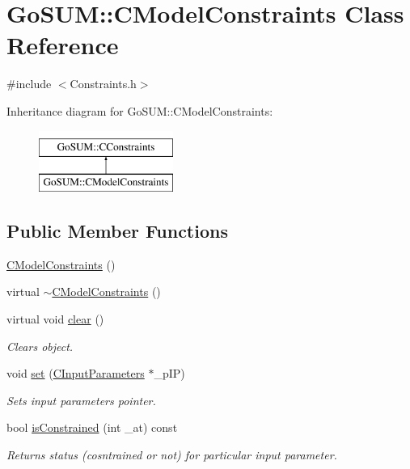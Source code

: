\hypertarget{class_go_s_u_m_1_1_c_model_constraints}{\section{Go\-S\-U\-M\-:\-:C\-Model\-Constraints Class Reference}
\label{class_go_s_u_m_1_1_c_model_constraints}
}


{\ttfamily \#include $<$Constraints.\-h$>$}

Inheritance diagram for Go\-S\-U\-M\-:\-:C\-Model\-Constraints\-:\begin{figure}[H]
\begin{center}
\leavevmode
\includegraphics[height=2.000000cm]{class_go_s_u_m_1_1_c_model_constraints}
\end{center}
\end{figure}
\subsection*{Public Member Functions}
\begin{DoxyCompactItemize}
\item 
\hyperlink{class_go_s_u_m_1_1_c_model_constraints_a1d6d718ab8ceeef75a4e35bbc747ccba}{C\-Model\-Constraints} ()
\item 
virtual \hyperlink{class_go_s_u_m_1_1_c_model_constraints_a903d48132b0bc708f1ae4c72bb1f1223}{$\sim$\-C\-Model\-Constraints} ()
\item 
virtual void \hyperlink{class_go_s_u_m_1_1_c_model_constraints_ab547fb9c0109eb85715d65caf04eed84}{clear} ()
\begin{DoxyCompactList}\small\item\em Clears object. \end{DoxyCompactList}\item 
void \hyperlink{class_go_s_u_m_1_1_c_model_constraints_a0191da2921b3dd708e7aa5466735402b}{set} (\hyperlink{class_go_s_u_m_1_1_c_input_parameters}{C\-Input\-Parameters} $\ast$\-\_\-p\-I\-P)
\begin{DoxyCompactList}\small\item\em Sets input parameters pointer. \end{DoxyCompactList}\item 
bool \hyperlink{class_go_s_u_m_1_1_c_model_constraints_a3b6c33a11d19b7efc0f293fb1252bae8}{is\-Constrained} (int \-\_\-at) const 
\begin{DoxyCompactList}\small\item\em Returns status (cosntrained or not) for particular input parameter. \end{DoxyCompactList}\end{DoxyCompactItemize}
